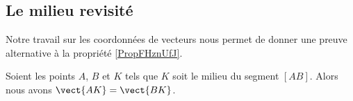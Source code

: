 \subsection{Le milieu revisité}

Notre travail sur les coordonnées de vecteurs nous permet de donner une preuve alternative à la propriété \ref{PropFHznUfJ}.

\begin{propriete}
    Soient les points \( A\), \( B\) et \( K\) tels que \( K\) soit le milieu du segment \( [AB]\). Alors nous avons \( \vect{ AK }=\vect{ BK }\).
\end{propriete}

